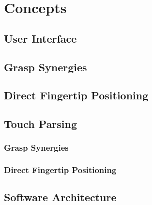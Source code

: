 \chapter{Concepts}
\label{chap:concepts}

\section{User Interface}

\section{Grasp Synergies}

\section{Direct Fingertip Positioning}

\section{Touch Parsing}

\subsection{Grasp Synergies}

\subsection{Direct Fingertip Positioning}

\section{Software Architecture}